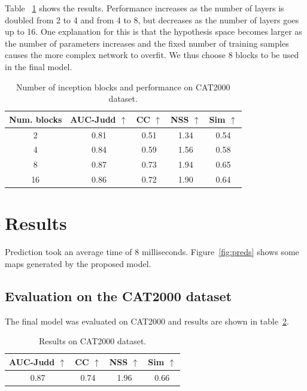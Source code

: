 \documentclass[conference]{IEEEtran}
\begin{document}
Table ~\ref{table:nlayers} shows the results.
Performance increases as the number of layers is doubled from 2 to 4
and from 4 to 8, but decreases as the number of layers goes up to 16.
One explanation for this is that the hypothesis space becomes larger
as the number of parameters increases and the fixed number of training
samples causes the more complex network to overfit.
We thus choose 8 blocks to be used in the final model.

\begin{table}
	\small
    \begin{center}
    \caption{Number of inception blocks and performance on CAT2000 dataset.}
    \label{table:nlayers}
    \begin{tabular}{|c|c|c|c|c|}
        \hline
        Num. blocks
            & AUC-Judd $\uparrow$ & CC $\uparrow$
            & NSS $\uparrow$ & Sim $\uparrow$\\
        \hline
        2 & 0.81 & 0.51 & 1.34 & 0.54\\
        \hline
        4 & 0.84 & 0.59 & 1.56 & 0.58\\
        \hline
        8 & 0.87 & 0.73 & 1.94 & 0.65\\
        \hline
        16 & 0.86 & 0.72 & 1.90 & 0.64\\
        \hline
    \end{tabular}
    \end{center}
\end{table}

\section{Results}
Prediction took an average time of 8 milliseconds.
Figure~\ref{fig:preds} shows some maps generated by the proposed model.

\subsection{Evaluation on the CAT2000 dataset}
The final model was evaluated on CAT2000 and results are shown
in table~\ref{table:cat200eval}.

\begin{table}
	\small
    \begin{center}
    \caption{Results on CAT2000 dataset.}
    \label{table:cat200eval}
    \begin{tabular}{|c|c|c|c|}
        \hline
            AUC-Judd $\uparrow$ & CC $\uparrow$
            & NSS $\uparrow$ & Sim $\uparrow$\\
        \hline
        0.87 & 0.74 & 1.96 & 0.66\\
        \hline
    \end{tabular}
    \end{center}
\end{table}
\end{document}
